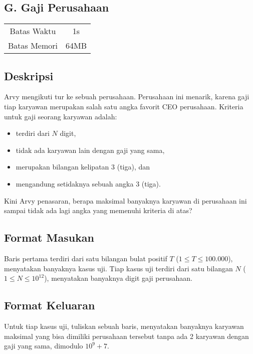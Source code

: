 \documentclass{article}
\begin{document}
\begin{center}
    \section*{G. Gaji Perusahaan}

    \begin{tabular}{ | c c | }
        \hline
        Batas Waktu  & 1s \\
        Batas Memori & 64MB \\
        \hline
    \end{tabular}
\end{center}

\subsection*{Deskripsi}

Arvy mengikuti tur ke sebuah perusahaan.
Perusahaan ini menarik, karena gaji tiap karyawan merupakan salah satu angka favorit CEO perusahaan.
Kriteria untuk gaji seorang karyawan adalah:
\begin{itemize}
    \item terdiri dari $N$ digit,
    \item tidak ada karyawan lain dengan gaji yang sama,
    \item merupakan bilangan kelipatan 3 (tiga), dan
    \item mengandung setidaknya sebuah angka 3 (tiga).
\end{itemize}
Kini Arvy penasaran, berapa maksimal banyaknya karyawan di perusahaan ini sampai tidak ada lagi angka yang memenuhi kriteria di atas?

\subsection*{Format Masukan}

Baris pertama terdiri dari satu bilangan bulat positif $T$ ($1 \leq T \leq 100.000$), menyatakan banyaknya kasus uji.
Tiap kasus uji terdiri dari satu bilangan $N$ ($1 \leq N \leq 10^{12}$), menyatakan banyaknya digit gaji perusahaan.

\subsection*{Format Keluaran}

Untuk tiap kasus uji, tuliskan sebuah baris, menyatakan banyaknya karyawan maksimal yang bisa dimiliki perusahaan tersebut tanpa ada 2 karyawan dengan gaji yang sama, dimodulo ${10}^9+7$.
\\
\end{document}
